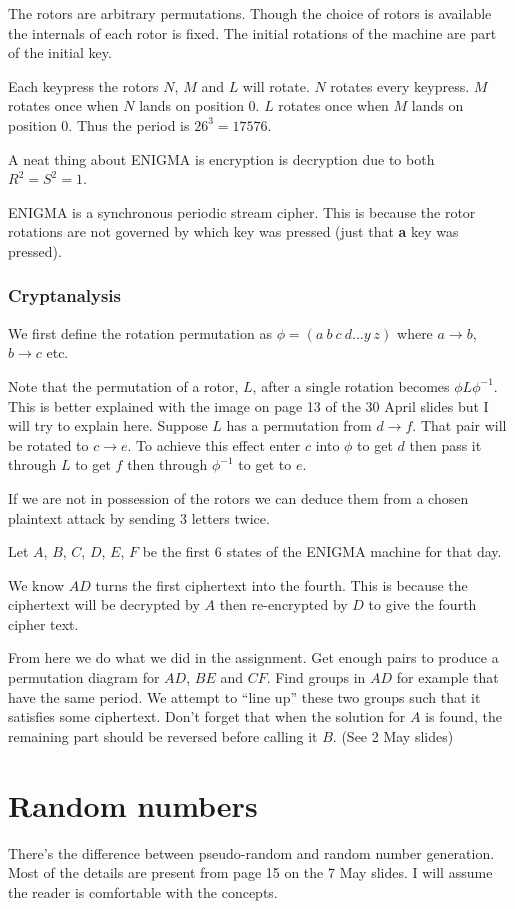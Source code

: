 \documentclass{report}
\begin{document}
The rotors are arbitrary permutations. Though the choice of rotors is available
the internals of each rotor is fixed. The initial rotations of the machine
are part of the initial key.

Each keypress the rotors $N$, $M$ and $L$ will rotate. $N$ rotates every
keypress. $M$ rotates once when $N$ lands on position 0. $L$ rotates
once when $M$ lands on position 0. Thus the period is $26^3 = 17576$.

A neat thing about ENIGMA is encryption is decryption due to both
$R^2 = S^2 = 1$.

ENIGMA is a synchronous periodic stream cipher. This is because the rotor
rotations are not governed by which key was pressed (just that \textbf{a} key
was pressed).

\subsection{Cryptanalysis}
We first define the rotation permutation as $\phi = (a\ b\ c\ d \ldots y\ z)$
where $a \to b$, $b \to c$ etc.

Note that the permutation of a rotor, $L$, after a single rotation becomes
$\phi L \phi^{-1}$. This is better explained with the image on page 13 of the
30 April slides but I will try to explain here. Suppose $L$ has a permutation
from $d \to f$. That pair will be rotated to $c \to e$. To achieve this effect
enter $c$ into $\phi$ to get $d$ then pass it through $L$ to get $f$ then
through $\phi^{-1}$ to get to $e$.

If we are not in possession of the rotors we can deduce them from a chosen
plaintext attack by sending 3 letters twice.

Let $A$, $B$, $C$, $D$, $E$, $F$ be the first 6 states of the ENIGMA machine
for that day.

We know $AD$ turns the first ciphertext into the fourth. This is because
the ciphertext will be decrypted by $A$ then re-encrypted by $D$ to give
the fourth cipher text.

From here we do what we did in the assignment. Get enough pairs to produce
a permutation diagram for $AD$, $BE$ and $CF$. Find groups in $AD$ for example
that have the same period. We attempt to ``line up'' these two groups such
that it satisfies some ciphertext. Don't forget that when the solution for $A$
is found, the remaining part should be reversed before calling it $B$.
(See 2 May slides)

\chapter{Random numbers}
There's the difference between pseudo-random and random number generation.
Most of the details are present from page 15 on the 7 May slides. I will
assume the reader is comfortable with the concepts.
\end{document}
